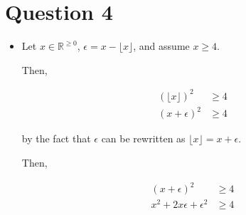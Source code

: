 \documentclass[12pt]{article}
\begin{document}
\section*{Question 4}

    \begin{itemize}
        \item

        Let $x \in \mathbb{R}^{\geq 0}$, $\epsilon = x - \lfloor x \rfloor$, and
        assume $x \geq 4$.

        \bigskip

        Then,

        \begin{align}
            (\lfloor x \rfloor)^2 &\geq 4\\
            (x + \epsilon)^2 &\geq 4
        \end{align}

        \bigskip

        by the fact that $\epsilon$ can be rewritten as $\lfloor x \rfloor = x + \epsilon$.

        \bigskip

        Then,

        \begin{align}
            (x + \epsilon)^2 &\geq 4\\
            x^2 + 2x\epsilon + \epsilon^2 &\geq 4\\
        \end{align}


    \end{itemize}
\end{document}
